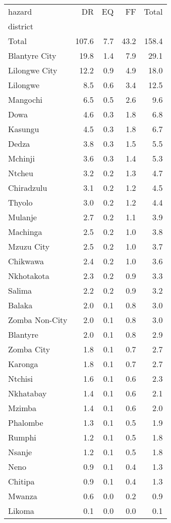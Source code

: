 \begin{tabular}{lrrrr}
\toprule
hazard &     DR &   EQ &    FF &  Total \\
district       &        &      &       &        \\
\midrule
Total          &  107.6 &  7.7 &  43.2 &  158.4 \\
Blantyre City  &   19.8 &  1.4 &   7.9 &   29.1 \\
Lilongwe City  &   12.2 &  0.9 &   4.9 &   18.0 \\
Lilongwe       &    8.5 &  0.6 &   3.4 &   12.5 \\
Mangochi       &    6.5 &  0.5 &   2.6 &    9.6 \\
Dowa           &    4.6 &  0.3 &   1.8 &    6.8 \\
Kasungu        &    4.5 &  0.3 &   1.8 &    6.7 \\
Dedza          &    3.8 &  0.3 &   1.5 &    5.5 \\
Mchinji        &    3.6 &  0.3 &   1.4 &    5.3 \\
Ntcheu         &    3.2 &  0.2 &   1.3 &    4.7 \\
Chiradzulu     &    3.1 &  0.2 &   1.2 &    4.5 \\
Thyolo         &    3.0 &  0.2 &   1.2 &    4.4 \\
Mulanje        &    2.7 &  0.2 &   1.1 &    3.9 \\
Machinga       &    2.5 &  0.2 &   1.0 &    3.8 \\
Mzuzu City     &    2.5 &  0.2 &   1.0 &    3.7 \\
Chikwawa       &    2.4 &  0.2 &   1.0 &    3.6 \\
Nkhotakota     &    2.3 &  0.2 &   0.9 &    3.3 \\
Salima         &    2.2 &  0.2 &   0.9 &    3.2 \\
Balaka         &    2.0 &  0.1 &   0.8 &    3.0 \\
Zomba Non-City &    2.0 &  0.1 &   0.8 &    3.0 \\
Blantyre       &    2.0 &  0.1 &   0.8 &    2.9 \\
Zomba City     &    1.8 &  0.1 &   0.7 &    2.7 \\
Karonga        &    1.8 &  0.1 &   0.7 &    2.7 \\
Ntchisi        &    1.6 &  0.1 &   0.6 &    2.3 \\
Nkhatabay      &    1.4 &  0.1 &   0.6 &    2.1 \\
Mzimba         &    1.4 &  0.1 &   0.6 &    2.0 \\
Phalombe       &    1.3 &  0.1 &   0.5 &    1.9 \\
Rumphi         &    1.2 &  0.1 &   0.5 &    1.8 \\
Nsanje         &    1.2 &  0.1 &   0.5 &    1.8 \\
Neno           &    0.9 &  0.1 &   0.4 &    1.3 \\
Chitipa        &    0.9 &  0.1 &   0.4 &    1.3 \\
Mwanza         &    0.6 &  0.0 &   0.2 &    0.9 \\
Likoma         &    0.1 &  0.0 &   0.0 &    0.1 \\
\bottomrule
\end{tabular}
